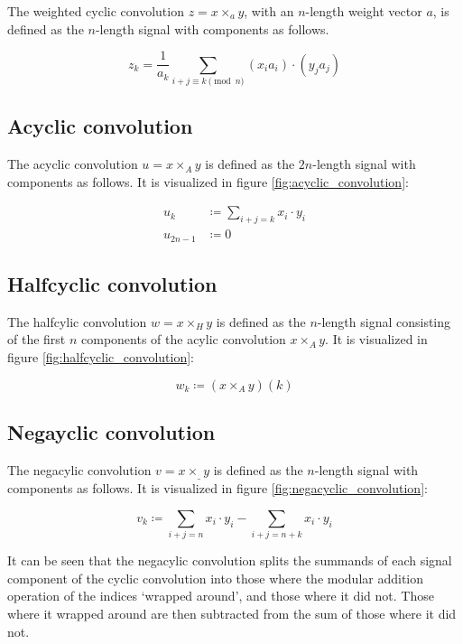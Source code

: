 The weighted cyclic convolution $z = x \times_a y$, with an $n$-length weight
vector $a$, is defined as the $n$-length signal with components as follows.

\[
		z_k = \frac{1}{a_k} \sum_{i + j \equiv k \pmod{n}} (x_i a_i) \cdot (y_j a_j)
\]

\subsection{Acyclic convolution}

The acyclic convolution $u = x \times_A y$ is defined as the $2n$-length signal
with components as follows. It is visualized in figure
\ref{fig:acyclic_convolution}:

\begin{align*}
		u_k & \coloneqq \sum_{i + j = k} x_i \cdot y_i \\
		u_{2n - 1} & \coloneqq 0
\end{align*}

\subsection{Halfcyclic convolution}

The halfcylic convolution $w = x \times_H y$ is defined as the $n$-length
signal consisting of the first $n$ components of the acylic convolution $x
\times_A y$. It is visualized in figure \ref{fig:halfcyclic_convolution}:

\[
		w_k \coloneqq (x \times_A y)(k)
\]

\subsection{Negayclic convolution}

The negacylic convolution $v = x \times_\_ y$ is defined as the $n$-length signal
with components as follows. It is visualized in figure
\ref{fig:negacyclic_convolution}:

\[
		v_k \coloneqq \sum_{i + j = n} x_i \cdot y_i - \sum_{i + j = n + k} x_i \cdot y_i
\]

It can be seen that the negacylic convolution splits the summands of each
signal component of the cyclic convolution into those where the modular
addition operation of the indices `wrapped around', and those where it did not.
Those where it wrapped around are then subtracted from the sum of those where
it did not.

